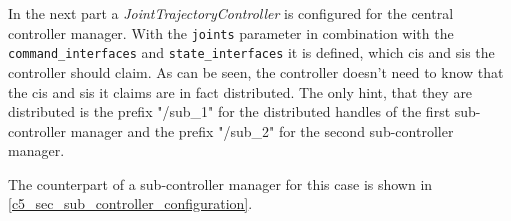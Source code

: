 In the next part a \textit{JointTrajectoryController} is configured for the central controller manager. With the \lstset{language=yaml,basicstyle=\small\ttfamily, breaklines=true}\lstinline{joints} parameter in combination with the 
\lstset{language=yaml,basicstyle=\small\ttfamily, breaklines=true}\lstinline{command_interfaces} and \lstset{language=yaml,basicstyle=\small\ttfamily, breaklines=true}\lstinline{state_interfaces} it is defined, which \glspl{ci} and \glspl{si} the controller should claim. As can be seen, the controller doesn't need to know that the \glspl{ci} and \glspl{si} it claims are in fact distributed. The only hint, that they are distributed is the prefix "/sub\_1" for the distributed \glspl{handle} of the first sub-controller manager and the prefix "/sub\_2" for the second sub-controller manager.\

The counterpart of a sub-controller manager for this case is shown in \autoref{c5_sec_sub_controller_configuration}.

